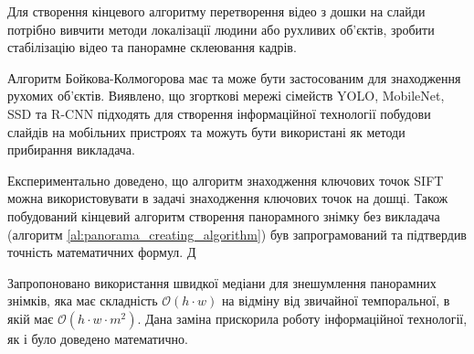 \chapterConclusion

Для створення кінцевого алгоритму перетворення відео з дошки на слайди 
потрібно вивчити методи локалізації людини або рухливих об'єктів,
зробити стабілізацію відео та панорамне склеювання кадрів.


Алгоритм Бойкова-Колмогорова має та може бути застосованим для знаходження
рухомих об'єктів.
Виявлено, що згорткові мережі сімейств YOLO, MobileNet, SSD та R-CNN 
підходять для створення інформаційної технології побудови слайдів на
мобільних пристроях та можуть бути використані як методи прибирання викладача.


Експериментально доведено, що алгоритм знаходження ключових точок SIFT можна використовувати 
в задачі знаходження ключових точок на дошці. Також побудований кінцевий алгоритм створення
панорамного знімку без викладача (алгоритм \ref{al:panorama_creating_algorithm}) був запрограмований та 
підтвердив точність математичних формул. Д


Запропоновано використання швидкої медіани для знешумлення панорамних знімків, 
яка має складність $\mathcal{O}(h \cdot w)$ на відміну від звичайної темпоральної, в
якій має $\mathcal{O}(h \cdot w \cdot m^2)$. Дана заміна прискорила роботу інформаційної
технології, як і було доведено математично.
